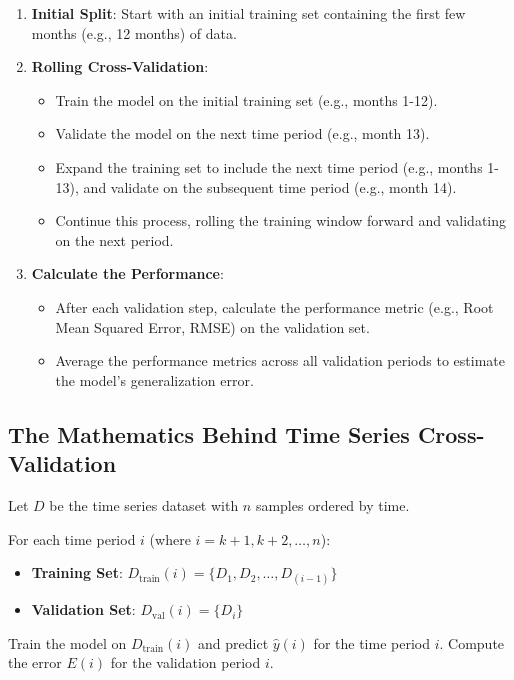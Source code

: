 \documentclass[10pt]{article}
\begin{document}
\begin{enumerate}
    \item \textbf{Initial Split}: Start with an initial training set containing the first few months (e.g., 12 months) of data.
    \item \textbf{Rolling Cross-Validation}:
    \begin{itemize}
        \item Train the model on the initial training set (e.g., months 1-12).
        \item Validate the model on the next time period (e.g., month 13).
        \item Expand the training set to include the next time period (e.g., months 1-13), and validate on the subsequent time period (e.g., month 14).
        \item Continue this process, rolling the training window forward and validating on the next period.
    \end{itemize}
    \item \textbf{Calculate the Performance}:
    \begin{itemize}
        \item After each validation step, calculate the performance metric (e.g., Root Mean Squared Error, RMSE) on the validation set.
        \item Average the performance metrics across all validation periods to estimate the model’s generalization error.
    \end{itemize}
\end{enumerate}

\subsection{The Mathematics Behind Time Series Cross-Validation}
Let \(D\) be the time series dataset with \(n\) samples ordered by time.

For each time period \(i\) (where \(i = k+1, k+2, \dots, n\)):

\begin{itemize}
    \item \textbf{Training Set}: \(D_{\text{train}}(i) = \{D_1, D_2, \dots, D_{(i-1)}\}\)
    \item \textbf{Validation Set}: \(D_{\text{val}}(i) = \{D_i\}\)
\end{itemize}

Train the model on \(D_{\text{train}}(i)\) and predict \(\hat{y}(i)\) for the time period \(i\). Compute the error \(E(i)\) for the validation period \(i\).
\end{document}
